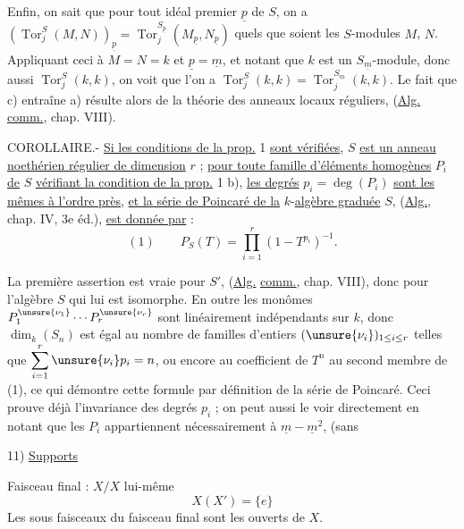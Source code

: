 Enfin, on sait que pour tout idéal premier $\underline p$ de $S$, on a $(\operatorname{Tor}^S_j(M,N))_{\underline p}=\operatorname{Tor}^{S_{\underline p}}_j(M_{\underline p},N_{\underline p})$ quels que soient les $S$-modules $M$, $N$. Appliquant ceci à $M=N=k$ et $\underline p=\underline m$, et notant que $k$ est un $S_{\underline m}$-module, donc aussi $\operatorname{Tor}^S_j(k,k)$, on voit que l'on a $\operatorname{Tor}^S_j(k,k)=\operatorname{Tor}^{S_{\underline m}}_j(k,k)$. Le fait que c) entraîne a) résulte alors de la théorie des anneaux locaux réguliers, (\uline{Alg.} \uline{comm.}, chap. VIII).

COROLLAIRE.- \uline{Si les conditions de la prop.} 1 \uline{sont vérifiées}, $S$ \uline{est un anneau noethérien régulier de dimension} $r$ ; \uline{pour toute famille d'éléments homogènes} $P_i$ \uline{de} $S$ \uline{vérifiant la condition de la prop.} 1 b), \uline{les degrés} $p_i=\deg(P_i)$ \uline{sont les mêmes à l'ordre près}, \uline{et la série de Poincaré de la} $k$-\uline{algèbre graduée} $S$, (\uline{Alg.}, chap. IV, 3e éd.), \uline{est donnée par} :
\[
(1)\qquad P_S(T)=\prod_{i=1}^r(1-T^{p_i})^{-1}.
\]

La première assertion est vraie pour $S'$, (\uline{Alg.} \uline{comm.}, chap. VIII), donc pour l'algèbre $S$ qui lui est isomorphe. En outre les monômes $P_1^{\unsure{\nu_1}}\cdots P_r^{\unsure{\nu_r}}$ sont linéairement indépendants sur $k$, donc $\dim_k(S_n)$ est égal au nombre de familles d'entiers $(\unsure{\nu_i})_{1\leq i\leq r}$ telles que $\displaystyle\sum_{i=1}^r\unsure{\nu_i}p_i=n$, ou encore au coefficient de $T^n$ au second membre de (1), ce qui démontre cette formule par définition de la série de Poincaré. Ceci prouve déjà l'invariance des degrés $p_i$ ; on peut aussi le voir directement en notant que les $P_i$ appartiennent nécessairement à $\underline m-\underline m^2$, (sans

11) \uline{Supports}

 Faisceau final : $X/X$ lui-même
\[X(X')=\{e\}\]
Les sous faisceaux du faisceau final sont les ouverts de $X$.

